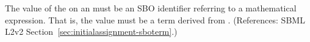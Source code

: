 The value of the   on an \InitialAssignment must be an
SBO identifier referring to a mathematical expression.  That is, the value
must be a term derived from \sbomathformula.  (References: SBML L2v2
Section~\ref{sec:initialassignment-sboterm}.)
